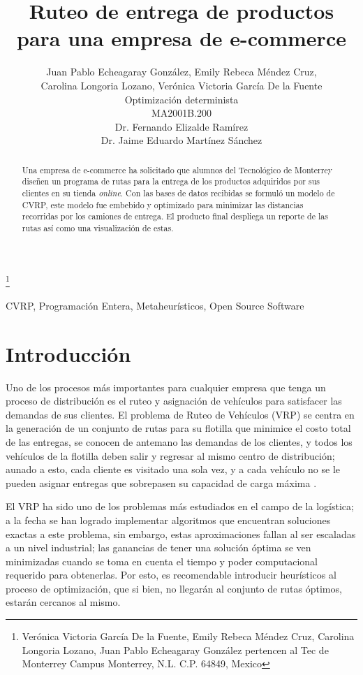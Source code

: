 \documentclass[journal]{IEEEtran}
\title{\LARGE \bf Ruteo de entrega de productos para una empresa de e-commerce}
\author{Juan Pablo Echeagaray González, Emily Rebeca Méndez Cruz, \\Carolina Longoria Lozano, Verónica Victoria García De la Fuente \\
Optimización determinista \\
MA2001B.200 \\
Dr. Fernando Elizalde Ramírez \\
Dr. Jaime Eduardo Martínez Sánchez}%
\begin{document}
    \thanks{Verónica Victoria García De la Fuente, Emily Rebeca Méndez Cruz, Carolina Longoria Lozano, Juan Pablo Echeagaray González pertencen al Tec de Monterrey Campus Monterrey, N.L. C.P. 64849, Mexico {\tt\small}}

    \maketitle

    \thispagestyle{empty}
    \pagestyle{empty}

    \begin{abstract}
        Una empresa de e-commerce ha solicitado que alumnos del Tecnológico de Monterrey diseñen un programa de rutas para la entrega de los productos adquiridos por sus clientes en su tienda \emph{online}. Con las bases de datos recibidas se formuló un modelo de CVRP, este modelo fue embebido y optimizado para minimizar las distancias recorridas por los camiones de entrega. El producto final despliega un reporte de las rutas así como una visualización de estas.
    \end{abstract}

    \begin{IEEEkeywords} 
        CVRP, Programación Entera, Metaheurísticos, Open Source Software
    \end{IEEEkeywords}

    \section{Introducción} \label{sec:intro} %

        Uno de los procesos más importantes para cualquier empresa que tenga un proceso de distribución es el ruteo y asignación de vehículos para satisfacer las demandas de sus clientes. El problema de Ruteo de Vehículos (VRP) se centra en la generación de un conjunto de rutas para su flotilla que minimice el costo total de las entregas, se conocen de antemano las demandas de los clientes, y todos los vehículos de la flotilla deben salir y regresar al mismo centro de distribución; aunado a esto, cada cliente es visitado una sola vez, y a cada vehículo no se le pueden asignar entregas que sobrepasen su capacidad de carga máxima \cite{elshaer2020taxonomic}.

        El VRP ha sido uno de los problemas más estudiados en el campo de la logística; a la fecha se han logrado implementar algoritmos que encuentran soluciones exactas a este problema, sin embargo, estas aproximaciones fallan al ser escaladas a un nivel industrial; las ganancias de tener una solución óptima se ven minimizadas cuando se toma en cuenta el tiempo y poder computacional requerido para obtenerlas. Por esto, es recomendable introducir heurísticos al proceso de optimización, que si bien, no llegarán al conjunto de rutas óptimos, estarán cercanos al mismo.
\end{document}
